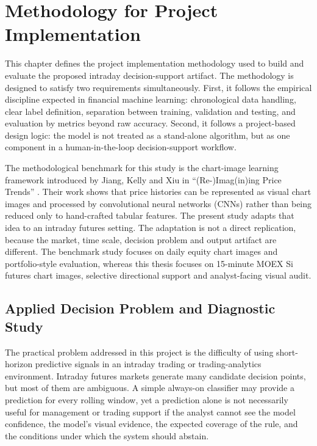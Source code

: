 
\section{Methodology for Project Implementation}
\label{sec:methodology}

This chapter defines the project implementation methodology used to build and evaluate the proposed intraday decision-support artifact. The methodology is designed to satisfy two requirements simultaneously. First, it follows the empirical discipline expected in financial machine learning: chronological data handling, clear label definition, separation between training, validation and testing, and evaluation by metrics beyond raw accuracy. Second, it follows a project-based design logic: the model is not treated as a stand-alone algorithm, but as one component in a human-in-the-loop decision-support workflow.

The methodological benchmark for this study is the chart-image learning framework introduced by Jiang, Kelly and Xiu in ``(Re-)Imag(in)ing Price Trends'' \cite{jiang_reimagining_price_trends}. Their work shows that price histories can be represented as visual chart images and processed by convolutional neural networks (CNNs) rather than being reduced only to hand-crafted tabular features. The present study adapts that idea to an intraday futures setting. The adaptation is not a direct replication, because the market, time scale, decision problem and output artifact are different. The benchmark study focuses on daily equity chart images and portfolio-style evaluation, whereas this thesis focuses on 15-minute MOEX Si futures chart images, selective directional support and analyst-facing visual audit.

\subsection{Applied Decision Problem and Diagnostic Study}
\label{subsec:diagnostic_problem}

The practical problem addressed in this project is the difficulty of using short-horizon predictive signals in an intraday trading or trading-analytics environment. Intraday futures markets generate many candidate decision points, but most of them are ambiguous. A simple always-on classifier may provide a prediction for every rolling window, yet a prediction alone is not necessarily useful for management or trading support if the analyst cannot see the model confidence, the model's visual evidence, the expected coverage of the rule, and the conditions under which the system should abstain.

